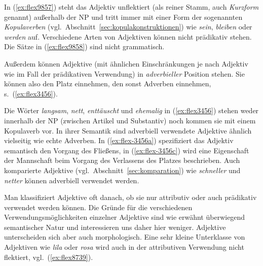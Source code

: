 In (\ref{ex:flex9857}) steht das Adjektiv unflektiert (als reiner Stamm, auch \textit{Kurzform} genannt) außerhalb der NP und tritt immer mit einer Form der sogenannten \textit{Kopulaverben} (vgl.\ Abschnitt~\ref{sec:kopulakonstruktionen}) wie \textit{sein}, \textit{bleiben} oder \textit{werden} auf.
Verschiedene Arten von Adjektiven können nicht prädikativ stehen.
Die Sätze in (\ref{ex:flex9858}) sind nicht grammatisch.

\begin{exe}
  \ex \label{ex:flex9858}
  \begin{xlist}
  \end{xlist}
\end{exe}


Außerdem können Adjektive (mit ähnlichen Einschränkungen je nach Adjektiv wie im Fall der prädikativen Verwendung) in \textit{adverbieller} Position stehen.
Sie können also den Platz einnehmen, den sonst Adverben einnehmen, s.\ (\ref{ex:flex3456}).

\begin{exe}
  \ex \label{ex:flex3456}
  \begin{xlist}
  \end{xlist}
\end{exe}

Die Wörter \textit{langsam}, \textit{nett}, \textit{enttäuscht} und \textit{ehemalig} in (\ref{ex:flex3456}) stehen weder innerhalb der NP (zwischen Artikel und Substantiv) noch kommen sie mit einem Kopulaverb vor.
In ihrer Semantik sind adverbiell verwendete Adjektive ähnlich vielseitig wie echte Adverben.
In (\ref{ex:flex-3456a}) spezifiziert das Adjektiv semantisch den Vorgang des Fließens, in (\ref{ex:flex-3456c}) wird eine Eigenschaft der Mannschaft beim Vorgang des Verlassens des Platzes beschrieben.
Auch komparierte Adjektive (vgl.\ Abschnitt~\ref{sec:komparation}) wie \textit{schneller} und \textit{netter} können adverbiell verwendet werden.

Man klassifiziert Adjektive oft danach, ob sie nur attributiv oder auch prädikativ verwendet werden können.
Die Gründe für die verschiedenen Verwendungsmöglichkeiten einzelner Adjektive sind wie erwähnt überwiegend semantischer Natur und interessieren uns daher hier weniger.
Adjektive unterscheiden sich aber auch morphologisch.
Eine sehr kleine Unterklasse von Adjektiven wie \textit{lila} oder \textit{rosa} wird auch in der attributiven Verwendung nicht flektiert, vgl.\ (\ref{ex:flex8739}).

